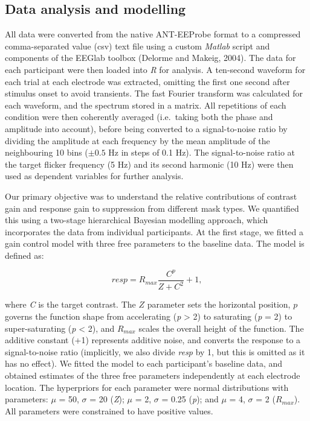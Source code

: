 \documentclass[]{article}
\begin{document}
\hypertarget{data-analysis-and-modelling}{%
\subsection{Data analysis and modelling}\label{data-analysis-and-modelling}}

All data were converted from the native ANT-EEProbe format to a compressed comma-separated value (csv) text file using a custom \emph{Matlab} script and components of the EEGlab toolbox (Delorme and Makeig, 2004). The data for each participant were then loaded into \emph{R} for analysis. A ten-second waveform for each trial at each electrode was extracted, omitting the first one second after stimulus onset to avoid transients. The fast Fourier transform was calculated for each waveform, and the spectrum stored in a matrix. All repetitions of each condition were then coherently averaged (i.e.~taking both the phase and amplitude into account), before being converted to a signal-to-noise ratio by dividing the amplitude at each frequency by the mean amplitude of the neighbouring 10 bins (\(\pm0.5\) Hz in steps of 0.1 Hz). The signal-to-noise ratio at the target flicker frequency (5 Hz) and its second harmonic (10 Hz) were then used as dependent variables for further analysis.

Our primary objective was to understand the relative contributions of contrast gain and response gain to suppression from different mask types. We quantified this using a two-stage hierarchical Bayesian modelling approach, which incorporates the data from individual participants. At the first stage, we fitted a gain control model with three free parameters to the baseline data. The model is defined as:

\begin{equation}
\label{eq:GC1}
resp = R_{max}\frac{C^p}{Z + C^2} + 1,
\end{equation}

where \emph{C} is the target contrast. The \(Z\) parameter sets the horizontal position, \(p\) governs the function shape from accelerating (\emph{p} \textgreater{} 2) to saturating (\emph{p} = 2) to super-saturating (\emph{p} \textless{} 2), and \(R_{max}\) scales the overall height of the function. The additive constant (+1) represents additive noise, and converts the response to a signal-to-noise ratio (implicitly, we also divide \emph{resp} by 1, but this is omitted as it has no effect). We fitted the model to each participant's baseline data, and obtained estimates of the three free parameters independently at each electrode location. The hyperpriors for each parameter were normal distributions with parameters: \(\mu\) = 50, \(\sigma\) = 20 (\emph{Z}); \(\mu\) = 2, \(\sigma\) = 0.25 (\emph{p}); and \(\mu\) = 4, \(\sigma\) = 2 (\(R_{max}\)). All parameters were constrained to have positive values.
\end{document}
